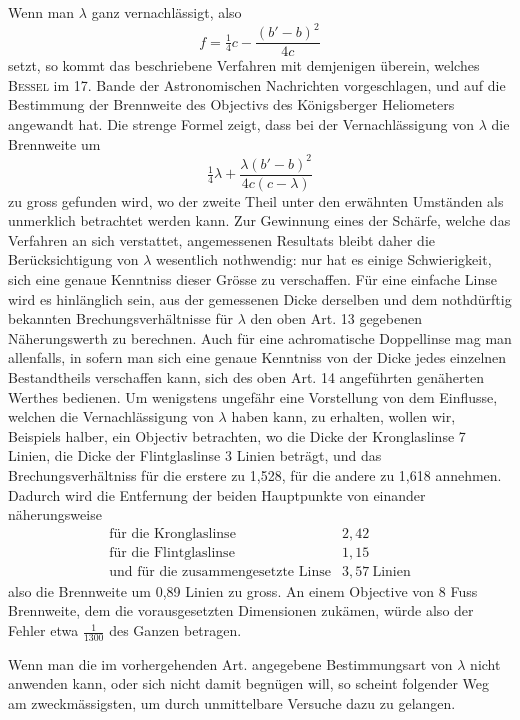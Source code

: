 Wenn man $\lambda$ ganz vernachlässigt, also
\[
f=\tfrac14c-\frac{(b'-b)^2}{4c}
\]
setzt, so kommt das beschriebene Verfahren mit demjenigen überein, welches \textsc{Bessel} im 17. Bande der Astronomischen Nachrichten vorgeschlagen, und auf die Bestimmung der Brennweite des Objectivs des Königsberger Heliometers angewandt hat. Die strenge Formel zeigt, dass bei der Vernachlässigung von $\lambda$ die Brennweite um
\[
\tfrac14\lambda+\frac{\lambda(b'-b)^2}{4c(c-\lambda)}
\]
zu gross gefunden wird, wo der zweite Theil unter den erwähnten Umständen als unmerklich betrachtet werden kann. Zur Gewinnung eines der Schärfe, welche das Verfahren an sich verstattet, angemessenen Resultats bleibt daher die Berücksichtigung von $\lambda$ wesentlich nothwendig: nur hat es einige Schwierigkeit, sich eine genaue Kenntniss dieser Grösse zu verschaffen. Für eine einfache Linse wird es hinlänglich sein, aus der gemessenen Dicke derselben und dem nothdürftig bekannten Brechungsverhältnisse für $\lambda$ den oben Art. 13 gegebenen Näherungswerth zu berechnen. Auch für eine achromatische Doppellinse mag man allenfalls, in sofern man sich eine genaue Kenntniss von der Dicke jedes einzelnen Bestandtheils verschaffen kann, sich des oben Art. 14 angeführten genäherten Werthes bedienen. Um wenigstens ungefähr eine Vorstellung von dem Einflusse, welchen die Vernachlässigung von $\lambda$ haben kann, zu erhalten, wollen wir, Beispiels halber, ein Objectiv betrachten, wo die Dicke der Kronglaslinse 7 Linien, die Dicke der Flintglaslinse 3 Linien beträgt, und das Brechungsverhältniss für die erstere zu 1,528, für die andere zu 1,618 annehmen. Dadurch wird die Entfernung der beiden Hauptpunkte von einander näherungsweise
\[
\begin{array}{lr}
\text{für die Kronglaslinse}&2{,}42\\
\text{für die Flintglaslinse}&1{,}15\\
\text{und für die zusammengesetzte Linse}&3{,}57\ \text{Linien}
\end{array}
\]
also die Brennweite um 0,89 Linien zu gross. An einem Objective von 8 Fuss Brennweite, dem die vorausgesetzten Dimensionen zukämen, würde also der Fehler etwa $\frac1{1300}$ des Ganzen betragen.

Wenn man die im vorhergehenden Art. angegebene Bestimmungsart von $\lambda$ nicht anwenden kann, oder sich nicht damit begnügen will, so scheint folgender Weg am zweckmässigsten, um durch unmittelbare Versuche dazu zu gelangen.

